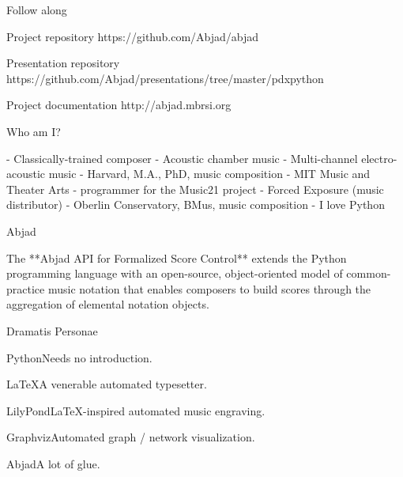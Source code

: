 \begin{frame}{Follow along}
\begin{block}{Project repository}
https://github.com/Abjad/abjad
\end{block}
\begin{block}{Presentation repository}
https://github.com/Abjad/presentations/tree/master/pdxpython
\end{block}
\begin{block}{Project documentation}
http://abjad.mbrsi.org
\end{block}
\end{frame}

\begin{frame}[fragile]{Who am I?}
\begin{markdown}
- Classically-trained composer
    - Acoustic chamber music 
    - Multi-channel electro-acoustic music
- Harvard, M.A., PhD, music composition
- MIT Music and Theater Arts
    - programmer for the Music21 project
- Forced Exposure (music distributor)
- Oberlin Conservatory, BMus, music composition
- I love Python
\end{markdown}
\end{frame}

\begin{frame}[fragile]{Abjad}
\begin{markdown}
The **Abjad API for Formalized Score Control** extends the Python
programming language with an open-source, object-oriented model of
common-practice music notation that enables composers to build scores
through the aggregation of elemental notation objects.
\end{markdown}
\end{frame}

\begin{frame}[fragile]{Dramatis Personae}
\begin{block}{Python}Needs no introduction.\end{block}
\begin{block}{LaTeX}A venerable automated typesetter.\end{block}
\begin{block}{LilyPond}LaTeX-inspired automated music engraving.\end{block}
\begin{block}{Graphviz}Automated graph / network visualization.\end{block}
\begin{block}{Abjad}A lot of glue.\end{block}
\end{frame}
